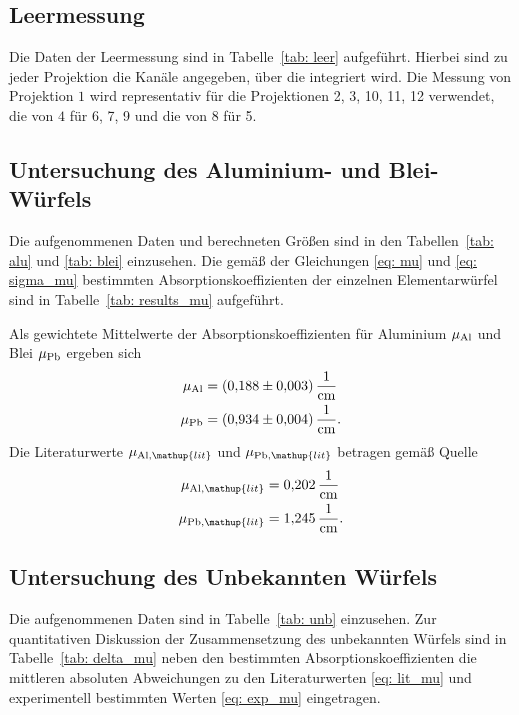 \subsection{Leermessung}
Die Daten der Leermessung sind in Tabelle~\ref{tab: leer} aufgeführt. Hierbei sind zu jeder Projektion %
die Kanäle angegeben, über die integriert wird. Die Messung von Projektion $1$ wird representativ für die
Projektionen 2, 3, 10, 11, 12 verwendet, die von $4$ für 6, 7, 9 und die von $8$ für 5.


\subsection{Untersuchung des Aluminium- und Blei-Würfels}
Die aufgenommenen Daten und berechneten Größen sind in den Tabellen~\ref{tab: alu} und \ref{tab: blei} einzusehen.
Die gemäß der Gleichungen \eqref{eq: mu} und \eqref{eq: sigma_mu} bestimmten Absorptionskoeffizienten
der einzelnen Elementarwürfel sind in Tabelle~\ref{tab: results_mu} aufgeführt.
\FloatBarrier



Als gewichtete Mittelwerte der Absorptionskoeffizienten für Aluminium $\mu_{\ce{Al}}$ und Blei $\mu_{\ce{Pb}}$
ergeben sich
\begin{align}
  \begin{aligned}
  \mu_{\ce{Al}} &= \SI{0.188(3)}{\per\centi\meter}\\
  \mu_{\ce{Pb}} &= \SI{0.934(4)}{\per\centi\meter}.
  \label{eq: exp_mu}
\end{aligned}
\end{align}
Die Literaturwerte $\mu_{\ce{Al}, \mathup{lit}}$ und $\mu_{\ce{Pb}, \mathup{lit}}$ betragen gemäß Quelle \cite{mu}
\begin{align}
  \begin{aligned}
  \mu_{\ce{Al}, \mathup{lit}} &= \SI{0.202}{\per\centi\meter} \\
  \mu_{\ce{Pb}, \mathup{lit}} &= \SI{1.245}{\per\centi\meter}.
  \label{eq: lit_mu}
\end{aligned}
\end{align}

\FloatBarrier

\subsection{Untersuchung des Unbekannten Würfels}
Die aufgenommenen Daten sind in Tabelle~\ref{tab: unb} einzusehen. Zur quantitativen Diskussion der Zusammensetzung %
des unbekannten Würfels sind in Tabelle~\ref{tab: delta_mu} neben den bestimmten Absorptionskoeffizienten die mittleren absoluten %
Abweichungen zu den Literaturwerten \eqref{eq: lit_mu} und experimentell bestimmten Werten \eqref{eq: exp_mu} eingetragen.
\FloatBarrier


\FloatBarrier
